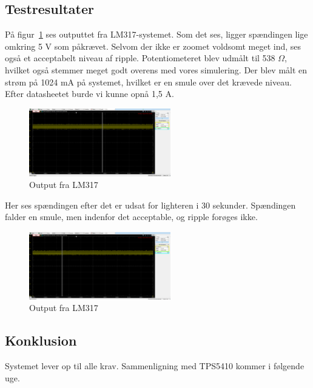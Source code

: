 \subsection{Testresultater}
\label{sec:testresultater}

På figur~\ref{fig:osc1} ses outputtet fra LM317-systemet. Som det ses, ligger spændingen lige omkring 5 V som påkrævet. Selvom der ikke er zoomet voldsomt meget ind, ses også et acceptabelt niveau af ripple. Potentiometeret blev udmålt til 538 $\Omega$, hvilket også stemmer meget godt overens med vores simulering. Der blev målt en strøm på 1024 mA på systemet, hvilket er en smule over det krævede niveau. Efter datasheetet burde vi kunne opnå 1,5 A.

\begin{figure}[h]
  \centering
  \includegraphics[width=0.55\textwidth]{osc1.png}
  \caption{Output fra LM317}
  \label{fig:osc1}
\end{figure}


Her ses spændingen efter det er udsat for lighteren i 30 sekunder. Spændingen falder en smule, men indenfor det acceptable, og ripple forøges ikke. 

\begin{figure}[h]
  \centering
  \includegraphics[width=0.55\textwidth]{osc2.png}
  \caption{Output fra LM317}
  \label{fig:osc2}
\end{figure}

\subsection{Konklusion}
\label{sec:konklusion-1}

Systemet lever op til alle krav. Sammenligning med TPS5410 kommer i følgende uge.

